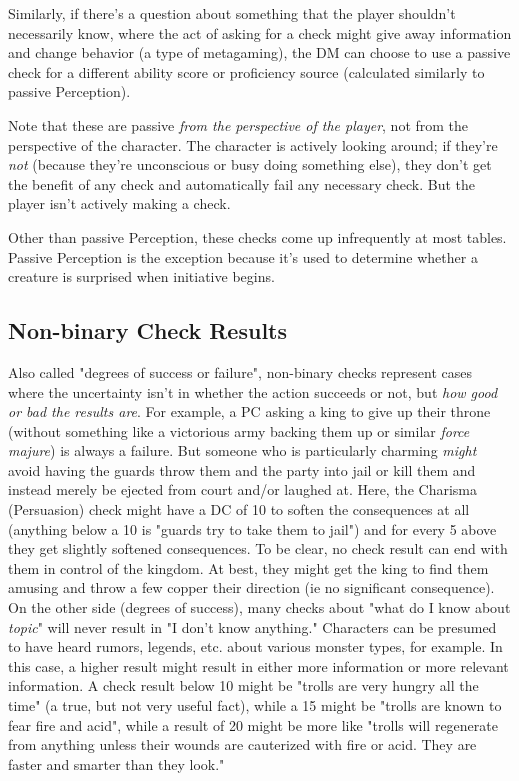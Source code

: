 \documentclass[10pt,twoside,openany,bg=none]{dndbook}
\begin{document}
Similarly, if there's a question about something that the player shouldn't necessarily know, where the act of asking for a check might give away information and change behavior (a type of metagaming), the DM can choose to use a passive check for a different ability score or proficiency source (calculated similarly to passive Perception).

Note that these are passive \textit{from the perspective of the player}, not from the perspective of the character. The character is actively looking around; if they're \textit{not} (because they're unconscious or busy doing something else), they don't get the benefit of any check and automatically fail any necessary check. But the player isn't actively making a check.

Other than passive Perception, these checks come up infrequently at most tables. Passive Perception is the exception because it's used to determine whether a creature is surprised when initiative begins.

\subsection{Non-binary Check Results}
Also called "degrees of success or failure", non-binary checks represent cases where the uncertainty isn't in whether the action succeeds or not, but \textit{how good or bad the results are}. For example, a PC asking a king to give up their throne (without something like a victorious army backing them up or similar \textit{force majure}) is always a failure. But someone who is particularly charming \textit{might} avoid having the guards throw them and the party into jail or kill them and instead merely be ejected from court and/or laughed at. Here, the Charisma (Persuasion) check might have a DC of 10 to soften the consequences at all (anything below a 10 is "guards try to take them to jail") and for every 5 above they get slightly softened consequences. To be clear, no check result can end with them in control of the kingdom. At best, they might get the king to find them amusing and throw a few copper their direction (ie no significant consequence). On the other side (degrees of success), many checks about "what do I know about \textit{topic}" will never result in "I don't know anything." Characters can be presumed to have heard rumors, legends, etc. about various monster types, for example. In this case, a higher result might result in either more information or more relevant information. A check result below 10 might be "trolls are very hungry all the time" (a true, but not very useful fact), while a 15 might be "trolls are known to fear fire and acid", while a result of 20 might be more like "trolls will regenerate from anything unless their wounds are cauterized with fire or acid. They are faster and smarter than they look."
\end{document}
